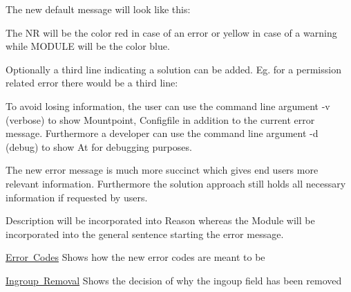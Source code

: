 \begin{DoxyCode}{0}
\end{DoxyCode}


The new default message will look like this\+:


\begin{DoxyCode}{0}
\end{DoxyCode}


The {\ttfamily NR} will be the color red in case of an error or yellow in case of a warning while {\ttfamily M\+O\+D\+U\+LE} will be the color blue.

Optionally a third line indicating a solution can be added. Eg. for a permission related error there would be a third line\+:


\begin{DoxyCode}{0}
\end{DoxyCode}


To avoid losing information, the user can use the command line argument {\ttfamily -\/v} (verbose) to show {\ttfamily Mountpoint}, {\ttfamily Configfile} in addition to the current error message. Furthermore a developer can use the command line argument {\ttfamily -\/d} (debug) to show {\ttfamily At} for debugging purposes.

The new error message is much more succinct which gives end users more relevant information. Furthermore the solution approach still holds all necessary information if requested by users.

{\ttfamily Description} will be incorporated into {\ttfamily Reason} whereas the {\ttfamily Module} will be incorporated into the general sentence starting the error message.


\begin{DoxyItemize}
\item \mbox{\hyperlink{doc_decisions_error_codes_md}{Error Codes}} Shows how the new error codes are meant to be
\item \mbox{\hyperlink{doc_decisions_ingroup_removal_md}{Ingroup Removal}} Shows the decision of why the {\ttfamily ingoup} field has been removed
\end{DoxyItemize}